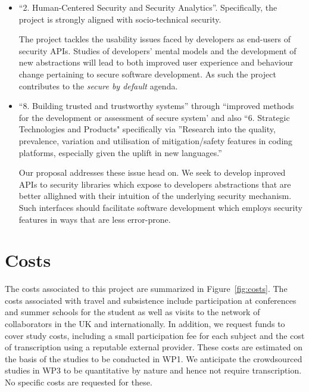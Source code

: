 \documentclass[10pt]{article}
\begin{document}
\begin{itemize}

\item ``2. Human-Centered Security and Security Analytics''. Specifically, the project is strongly aligned with socio-technical security. 

The project tackles the usability issues faced by developers as end-users of security APIs. Studies of developers' mental models and the development of new abstractions will lead to both improved user experience and behaviour change pertaining to secure software development. As such the project contributes to the \textit{secure by default} agenda.


\item ``8. Building trusted and trustworthy systems'' through ``improved methods for the development or assessment of secure system' and also 
``6. Strategic Technologies and Products" specifically via ''Research into the quality, prevalence, variation and utilisation of mitigation/safety features in coding platforms, especially given the uplift in new languages.'' 

Our proposal addresses these issue head on. We seek to develop inproved APIs to security libraries which expose to developers abstractions that are better allighned with their intuition of the underlying security mechanism.  Such interfaces should facilitate software development which employs security features in ways that are less error-prone. 

\end{itemize} 








 


\section{Costs}
The costs associated to this project are summarized in Figure~\ref{fig:costs}.  
The costs associated with travel and subsistence include participation at conferences and summer schools for the student as well as visits to the network of collaborators in the UK and internationally. In addition, we request funds to cover study costs, including a small participation fee for each subject and the cost of transcription using a reputable external provider. These costs are estimated on the basis of the studies to be conducted in WP1. We anticipate the crowdsourced studies in WP3 to be quantitative by nature and hence not require transcription. No specific costs are requested for these.
\end{document}
